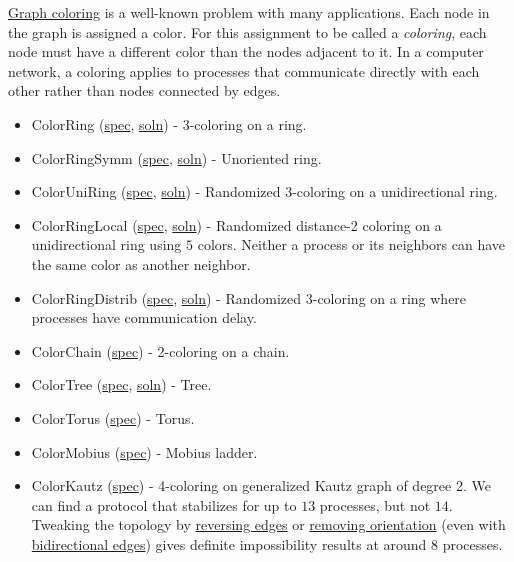 \href{http://en.wikipedia.org/wiki/Graph_coloring}{Graph coloring} is a well-known problem with many applications.
Each node in the graph is assigned a color.
For this assignment to be called a \textit{coloring}, each node must have a different color than the nodes adjacent to it.
In a computer network, a coloring applies to processes that communicate directly with each other rather than nodes connected by edges.
\begin{itemize}
\item ColorRing (\href{\examplespec/ColorRing.prot}{spec}, \href{\examplesoln/ColorRing.prot}{soln})
- 3-coloring on a ring.
\item ColorRingSymm (\href{\examplespec/ColorRingSymm.prot}{spec}, \href{\examplesoln/ColorRingSymm.prot}{soln})
- Unoriented ring.
\item ColorUniRing (\href{\examplespec/ColorUniRing.prot}{spec}, \href{\examplesoln/ColorUniRing.prot}{soln})
- Randomized 3-coloring on a unidirectional ring.
\item ColorRingLocal (\href{\examplespec/ColorRingLocal.prot}{spec}, \href{\examplesoln/ColorRingLocal.prot}{soln})
- Randomized distance-2 coloring on a unidirectional ring using $5$ colors.
Neither a process or its neighbors can have the same color as another neighbor.
\item ColorRingDistrib (\href{\examplespec/ColorRingDistrib.prot}{spec}, \href{\examplesoln/ColorRingDistrib.prot}{soln})
- Randomized 3-coloring on a ring where processes have communication delay.
\item ColorChain (\href{\examplespec/ColorChain.prot}{spec})
- 2-coloring on a chain.
\item ColorTree (\href{\examplespec/ColorTree.prot}{spec}, \href{\examplesoln/ColorTree.prot}{soln})
- Tree.
\item ColorTorus (\href{\examplespec/ColorTorus.prot}{spec})
- Torus.
\item ColorMobius (\href{\examplespec/ColorMobius.prot}{spec})
- Mobius ladder.
\item ColorKautz (\href{\examplespec/ColorKautz.prot}{spec})
- 4-coloring on generalized Kautz graph of degree 2.
We can find a protocol that stabilizes for up to $13$ processes, but not $14$.
Tweaking the topology by
\href{\examplespec/ColorKautzReverse.prot}{reversing edges}
or
\href{\examplespec/ColorKautzSymm.prot}{removing orientation}
(even with \href{\examplespec/ColorKautzBi.prot}{bidirectional edges})
gives definite impossibility results at around $8$ processes.
\end{itemize}

